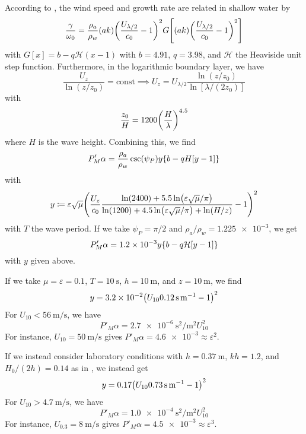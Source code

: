 \documentclass{jfm}
\renewcommand*{\epsilon}{\varepsilon}
\begin{document}
According to \citet{donelan2006wave}, the wind speed and growth rate
are related in shallow water by
\begin{equation}
  \frac{\gamma}{\omega_0} = \frac{\rho_a}{\rho_w} (ak)
  \pqty{\frac{U_{\lambda/2}}{c_0} - 1}^2
  G \bqty{(ak)
  \pqty{\frac{U_{\lambda/2}}{c_0} - 1}^2}
\end{equation}
with $G[x] = b - q \mathcal{H}(x - 1)$ with $b = 4.91$, $q = 3.98$, and
$\mathcal{H}$ the Heaviside unit step function.
Furthermore, in the logarithmic boundary layer, we have
\begin{equation}
  \frac{U_z}{\ln(z/z_0)} = \text{const}
  \implies U_{z} = U_{\lambda/2} \frac{\ln(z/z_0)}{\ln[\lambda/(2 z_0)]}
\end{equation}
with \citep{taylor2001dependence}
\begin{equation}
  \frac{z_0}{H} = 1200 \pqty{\frac{H}{\lambda}}^{4.5}
\end{equation}
where $H$ is the wave height.
Combining this, we find
\begin{equation}
  P'_M \alpha = \frac{\rho_a}{\rho_w} \csc(\psi_P)
  y \Bqty{b-qH[y - 1]}
\end{equation}
with
\begin{equation}
  y \coloneqq
  \epsilon \sqrt{\mu}
  \pqty{\frac{U_{z}}{c_0} \frac{\ln(2400)+5.5\ln(\epsilon \sqrt{\mu}/\pi)}
    {\ln(1200) + 4.5 \ln(\epsilon \sqrt{\mu}/\pi) + \ln(H/z)} - 1}^2
\end{equation}
with $T$ the wave period.
If we take $\psi_P = \pi/2$ and $\rho_a/\rho_w = \num{1.225e-3}$, we get
\begin{equation}
  P'_M \alpha = \num{1.2e-3} y \Bqty{b-q \mathcal{H}[y - 1]}
\end{equation}
with $y$ given above.

If we take $\mu = \epsilon = 0.1$, $T = \SI{10}{\second}$, $h =
\SI{10}{\meter}$, and $z = \SI{10}{\meter}$, we find
\begin{equation}
  y = \num{3.2e-2} \pqty{U_{10} \SI{0.12}{\second\per\meter} - 1}^2
\end{equation}
For $U_{10} < \SI{56}{\meter\per\second}$, we have
\begin{equation}
  P'_M \alpha = \SI{2.7e-6}{\second\squared\per\meter\squared} U_{10}^2
\end{equation}
For instance, $U_{10} = \SI{50}{\meter\per\second}$ gives
$P'_M \alpha = \num{4.6e-3} \approx \epsilon^2$.

If we instead consider laboratory conditions with $h=\SI{0.37}{\meter}$,
$kh = 1.2$, and $H_0/(2h) = 0.14$ as in \citet{feddersen2005wind}, we
instead get
\begin{equation}
  y = \num{0.17} \pqty{U_{10} \SI{0.73}{\second\per\meter} - 1}^2
\end{equation}
For $U_{10} > \SI{4.7}{\meter\per\second}$, we have
\begin{equation}
  P'_M \alpha = \SI{1.0e-4}{\second\squared\per\meter\squared} U_{10}^2
\end{equation}
For instance, $U_{0.3} = \SI{8}{\meter\per\second}$ gives
$P'_M \alpha = \num{4.5e-3} \approx \epsilon^3$.
\end{document}
